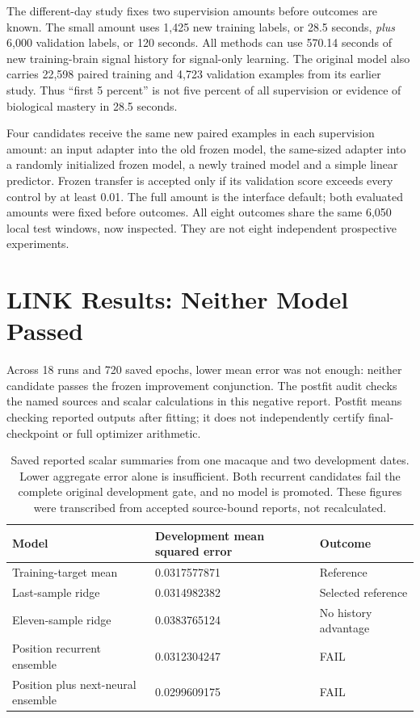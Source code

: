 The different-day study fixes two supervision amounts before outcomes are
known. The small amount uses 1,425 new training labels, or 28.5 seconds, \emph{plus}
6,000 validation labels, or 120 seconds. All methods can use 570.14 seconds of
new training-brain signal history for signal-only learning. The original model
also carries 22,598 paired training and 4,723 validation examples from its
earlier study. Thus ``first 5 percent'' is not five percent of all supervision
or evidence of biological mastery in 28.5 seconds.

Four candidates receive the same new paired examples in each supervision
amount: an input adapter into the old frozen model, the same-sized adapter into
a randomly initialized frozen model, a newly trained model and a simple linear
predictor. Frozen transfer is accepted only if its validation score exceeds
every control by at least 0.01. The full amount is the interface default;
both evaluated amounts were fixed before outcomes. All eight outcomes share
the same 6,050 local test windows, now inspected. They are not eight independent
prospective experiments.

\section{LINK Results: Neither Model Passed}

Across 18 runs and 720 saved epochs, lower mean error was not enough: neither candidate passes the frozen improvement conjunction. The postfit audit checks the named sources and scalar calculations in this negative report. Postfit means checking reported outputs after fitting; it does not independently certify final-checkpoint or full optimizer arithmetic.

\begin{table}[t]
\centering\small
\begin{tabular}{p{.40\linewidth}p{.34\linewidth}p{.18\linewidth}}
\toprule Model & Development mean squared error & Outcome\\\midrule
Training-target mean &0.0317577871&Reference\\
Last-sample ridge &0.0314982382&Selected reference\\
Eleven-sample ridge &0.0383765124&No history advantage\\
Position recurrent ensemble &0.0312304247&FAIL\\
Position plus next-neural ensemble &0.0299609175&FAIL\\\bottomrule
\end{tabular}
\caption{Saved reported scalar summaries from one macaque and two development
dates. Lower aggregate error alone is insufficient. Both recurrent candidates
fail the complete original development gate, and no model is promoted. These
figures were transcribed from accepted source-bound reports, not recalculated.}
\end{table}

